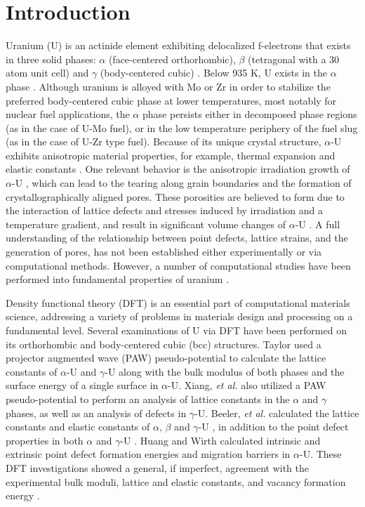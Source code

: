 \documentclass[utf8]{frontiersSCNS} %
\begin{document}
\section{Introduction}

Uranium (U) is an actinide element exhibiting delocalized f-electrons that exists in three solid phases: $\alpha$ (face-centered orthorhombic), $\beta$ (tetragonal with a 30 atom unit cell) and $\gamma$ (body-centered cubic) \cite{yoo1998}. Below 935 K, U exists in the $\alpha$ phase \cite{soderlind1998}. Although uranium is alloyed with Mo or Zr in order to stabilize the preferred body-centered cubic phase at lower temperatures, most notably for nuclear fuel applications, the $\alpha$ phase persists either in decomposed phase regions (as in the case of U-Mo fuel), or in the low temperature periphery of the fuel slug (as in the case of U-Zr type fuel). Because of its unique crystal structure, $\alpha$-U exhibits anisotropic material properties, for example, thermal expansion \cite{lloyd1966} and elastic constants \cite{fisher1958}. One relevant behavior is the anisotropic irradiation growth of $\alpha$-U \cite{leggett1963}, which can lead to the tearing along grain boundaries and the formation of crystallographically aligned pores. These porosities are believed to form due to the interaction of lattice defects and stresses induced by irradiation and a temperature gradient, and result in significant volume changes of $\alpha$-U \cite{leggett1963,paine1958}. A full understanding of the relationship between point defects, lattice strains, and the generation of pores, has not been established either experimentally or via computational methods. However, a number of computational studies have been performed into fundamental properties of uranium \cite{jokisaari2020}. 

Density functional theory (DFT) is an essential part of computational materials science, addressing a variety of problems in materials design and processing on a fundamental level. Several examinations of U via DFT have been performed on its orthorhombic and body-centered cubic (bcc) structures. Taylor \cite{taylor2008} used a projector augmented wave (PAW) pseudo-potential to calculate the lattice constants of $\alpha$-U and $\gamma$-U along with the bulk modulus of both phases and the surface energy of a single surface in $\alpha$-U. Xiang, \textit{et al.} \cite{xiang2008} also utilized a PAW pseudo-potential to perform an analysis of lattice constants in the $\alpha$ and $\gamma$ phases, as well as an analysis of defects in $\gamma$-U. Beeler, \textit{et al.} calculated the lattice constants and elastic constants of $\alpha$, $\beta$ and $\gamma$-U \cite{beeler2013}, in addition to the point defect properties in both $\alpha$ and $\gamma$-U \cite{beeler2010}. Huang and Wirth \cite{wirth2011, wirth2012} calculated intrinsic and extrinsic point defect formation energies and migration barriers in $\alpha$-U. These DFT investigations showed a general, if imperfect, agreement with the experimental bulk moduli, lattice and elastic constants, and vacancy formation energy \cite{yoo1998, barrett1963, matter1980}. 
\end{document}
